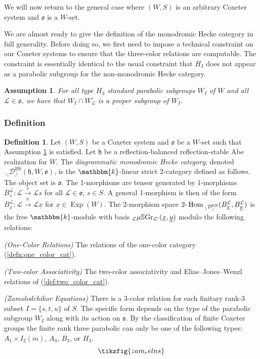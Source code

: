 \documentclass{amsart}
\renewcommand{\k}{\mathbbm{k}}
\newcommand{\scrL}{\mathcal{L}}
\DeclareMathOperator{\Hom}{Hom}
\newcommand{\TwoHom}{2\textnormal{-}\Hom}
\newcommand{\fr}[1]{\mathfrak{#1}}
\DeclareMathOperator{\BS}{BS}
\newcommand{\EWmon}[2]{\:_{#1 \backslash} \mathcal{D}_{/ #2} }
\DeclareMathOperator{\Exp}{Exp}
\newcommand{\VSGraph}{\mu\mathbb{S}\textnormal{Gr}}
\newcommand{\ux}{\underline{x}}
\newcommand{\uy}{\underline{y}}
\newtheorem{assumption}[subsubsection]{Assumption}
\theoremstyle{definition}
\newtheorem{definition}[subsubsection]{Definition}
\numberwithin{equation}{subsection}
\begin{document}
We will now return to the general case where $(W,S)$ is an arbitrary Coxeter system and $\fr{o}$ is a $W$-set.

We are almost ready to give the definition of the monodromic Hecke category in full generality.
Before doing so, we first need to impose a technical constraint on our Coxeter systems to ensure that the three-color relations are computable.
The constraint is essentially identical to the usual constraint that $H_3$ does not appear as a parabolic subgroup for the non-monodromic Hecke category.

\begin{assumption}\label{ass:no_H3_copy}
    For all type $H_3$ standard parabolic subgroups $W_I$ of $W$ and all $\scrL \in \fr{o}$, we have that $W_I \cap W_{\scrL}^{\circ}$ is a proper subgroup of $W_I$.
\end{assumption}

\subsubsection{Definition}

\begin{definition}\label{def:diag_hecke_cat}
    Let $(W,S)$ be a Coxeter system and $\fr{o}$ be a $W$-set such that Assumption \ref{ass:no_H3_copy} is satisfied.
    Let $\fr{h}$ be a reflection-balanced reflection-stable Abe realization for $W$.
    The \emph{diagrammatic monodromic Hecke category}, denoted $\EWmon{}{}^{\BS} (\fr{h}, W, \fr{o})$, is the $\k$-linear strict 2-category defined as follows.
    The object set is $\fr{o}$. The 1-morphisms are tensor generated by 1-morphisms $B_s^{\scrL} : \scrL \stackrel{s}{\to} \scrL s$ for all $\scrL \in \fr{o}$, $s \in S$.
    A general 1-morphism is then of the form $B_{\ux}^{\scrL} : \scrL \stackrel{\ux}{\to} \scrL \ux$ for $\ux \in \Exp (W)$. 
    The 2-morphism space $\TwoHom_{\EWmon{}{}^{\BS}} (B_{\ux}^{\scrL}, B_{\uy}^{\scrL})$ is the free $\k$-module with basis ${}_{\scrL} \VSGraph_{\scrL'} (\ux, \uy)$ modulo the following relations:
    
        \emph{(One-Color Relations)} The relations of the one-color category (\ref{defn:one_color_cat}).
       
        \emph{(Two-color Associativity)} The two-color associativity and Elias--Jones--Wenzl relations of (\ref{def:two_color_cat}).

        \emph{(Zamolodchikov Equations)} There is a 3-color relation for each finitary rank-3 subset $I = \{s,t,u\}$ of $S$. 
        The specific form depends on the type of the parabolic subgroup $W_I$ along with its action on $\fr{o}$.
        By the classification of finite Coxeter groups the finite rank three parabolic can only be one of the following types: $A_1 \times I_2 (m)$, $A_3$, $B_3$, or $H_3$.
        \begin{equation}
            \tikzfig{zam_relns} 
        \end{equation}
    \end{definition}
\end{document}
